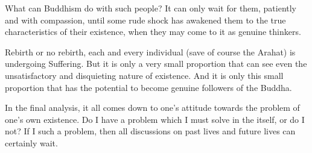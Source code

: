 What can Buddhism do with such people? It can only wait for them, patiently and with compassion, until some rude shock has awakened them to the true characteristics of their existence, when they may come to it as genuine thinkers.

Rebirth or no rebirth, each and every individual (save of course the Arahat) is undergoing Suffering. But it is only a very small proportion that can see even the unsatisfactory and disquieting nature of existence. And it is only this small proportion that has the potential to become genuine followers of the Buddha.

In the final analysis, it all comes down to one's attitude towards the problem of one's own existence. Do I have a  problem which I must solve in the  itself, or do I not? If I  such a problem, then all discussions on past lives and future lives can certainly wait.
